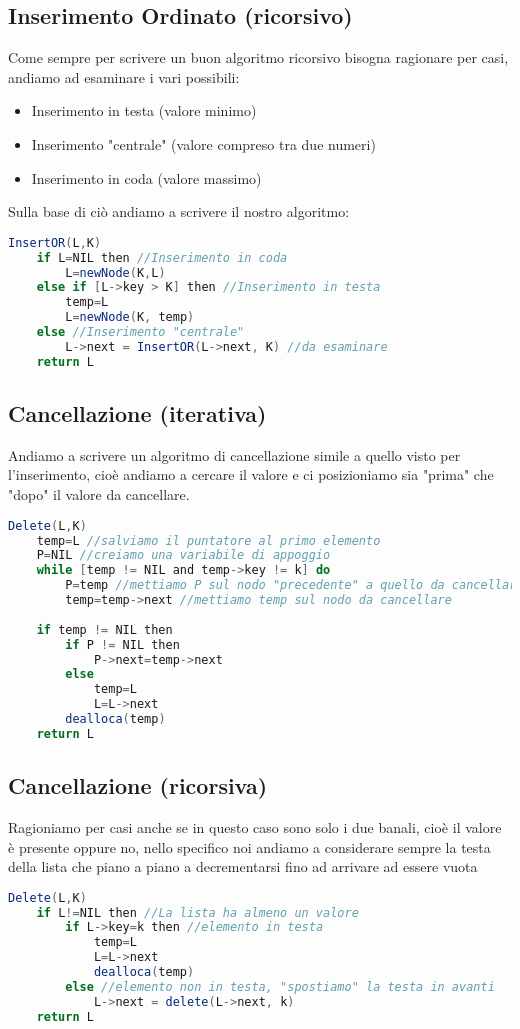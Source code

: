 \subsection{Inserimento Ordinato (ricorsivo)}
Come sempre per scrivere un buon algoritmo ricorsivo bisogna ragionare per casi, andiamo ad esaminare i vari possibili:
\begin{itemize}
\item Inserimento in testa (valore minimo)
\item Inserimento "centrale" (valore compreso tra due numeri)
\item Inserimento in coda (valore massimo)
\end{itemize}
Sulla base di ciò andiamo a scrivere il nostro algoritmo:
\begin{lstlisting}[language=Java]
InsertOR(L,K)
	if L=NIL then //Inserimento in coda
		L=newNode(K,L)
	else if [L->key > K] then //Inserimento in testa
		temp=L
		L=newNode(K, temp)
	else //Inserimento "centrale"
		L->next = InsertOR(L->next, K) //da esaminare
	return L 	
\end{lstlisting}

\subsection{Cancellazione (iterativa)}
Andiamo a scrivere un algoritmo di cancellazione simile a quello visto per l'inserimento, cioè andiamo a cercare il valore e ci posizioniamo sia "prima" che "dopo" il valore da cancellare.
\newpage
\begin{lstlisting}[language=Java]
Delete(L,K)
	temp=L //salviamo il puntatore al primo elemento
	P=NIL //creiamo una variabile di appoggio
	while [temp != NIL and temp->key != k] do 
		P=temp //mettiamo P sul nodo "precedente" a quello da cancellare
		temp=temp->next //mettiamo temp sul nodo da cancellare
		
	if temp != NIL then 
		if P != NIL then 
			P->next=temp->next
		else
			temp=L
			L=L->next
		dealloca(temp)
	return L 	
\end{lstlisting}

\subsection{Cancellazione (ricorsiva)}
Ragioniamo per casi anche se in questo caso sono solo i due banali, cioè il valore è presente oppure no, nello specifico noi andiamo a considerare sempre la testa della lista che piano a piano a decrementarsi fino ad arrivare ad essere vuota
\begin{lstlisting}[language=Java]
Delete(L,K)
	if L!=NIL then //La lista ha almeno un valore
		if L->key=k then //elemento in testa
			temp=L
			L=L->next
			dealloca(temp)
		else //elemento non in testa, "spostiamo" la testa in avanti
			L->next = delete(L->next, k)
	return L
\end{lstlisting}

